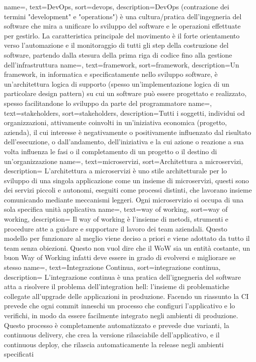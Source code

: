 {
	name=,
	text=DevOps,
	sort=devops,
	description={DevOps (contrazione dei termini "development" e "operations") è una cultura/pratica dell'ingegneria del software che mira a unificare lo sviluppo del software e le operazioni effettuate per gestirlo. La caratteristica principale del movimento è il forte orientamento verso l'automazione e il monitoraggio di tutti gli step della costruzione del software, partendo dalla stesura della prima riga di codice fino alla gestione dell'infrastruttura}
}
{
	name=,
	text=framework,
	sort=framework,
	description={Un framework, in informatica e specificatamente nello sviluppo software, è un'architettura logica di supporto (spesso un'implementazione logica di un particolare design pattern) su cui un software può essere progettato e realizzato, spesso facilitandone lo sviluppo da parte del programmatore}
}
{
	name=,
	text=stakeholders,
	sort=stakeholders,
	description={Tutti i soggetti, individui od organizzazioni, attivamente coinvolti in un’iniziativa economica (progetto, azienda), il cui interesse è negativamente o positivamente influenzato dal risultato dell’esecuzione, o dall’andamento, dell’iniziativa e la cui azione o reazione a sua volta influenza le fasi o il completamento di un progetto o il destino di un’organizzazione}
}
{
	name=,
	text=microservizi,
	sort=Architettura a microservizi,
	description={ L'architettura a microservizi è uno stile architetturale per lo sviluppo di una singola applicazione come un insieme di microservizi, questi sono dei servizi piccoli e autonomi, eseguiti come	processi distinti, che lavorano insieme comunicando mediante meccanismi leggeri. Ogni microservizio si occupa di una sola specifica unità applicativa}
}
{
	name=,
	text=way of working,
	sort=way of working,
	description={ Il way of working è l'insieme di metodi, strumenti e procedure atte a guidare e supportare il lavoro dei team aziendali. Questo modello per funzionare al meglio viene deciso a priori e viene adottato da tutto il team senza obiezioni. Questo non vuol dire che il WoW sia un entità costante, un buon Way of Working infatti deve essere in grado di evolversi e migliorare se stesso}
}
{
	name=,
	text=Integrazione Continua,
	sort=integrazione continua,
	description={ L'integrazione continua è una pratica dell'ignegneria del software atta a risolvere il problema dell'integration hell: l'insieme di problematiche collegate all'upgrade delle applicazioni in produzione. Facendo un riassunto la CI prevede che ogni commit inneschi un processo che configuri l'applicativo e lo verifichi, in modo da essere facilmente integrato negli ambienti di produzione. Questo processo è completamente automatizzato e prevede due varianti, la continuous delivery, che crea la versione rilasciabile dell'applicativo, e il continuous deploy, che rilascia automaticamente la release negli ambienti specificati}
}
